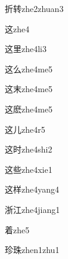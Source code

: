 \begin{verbete}[7;8]{折转}{zhe2zhuan3}
\end{verbete}

\begin{verbete}[7]{这}{zhe4}
\end{verbete}

\begin{verbete}[7;7]{这里}{zhe4li3}
\end{verbete}

\begin{verbete}[7;3]{这么}{zhe4me5}
\end{verbete}

\begin{verbete}[7;5]{这末}{zhe4me5}
\end{verbete}

\begin{verbete}[7;14]{这麽}{zhe4me5}
\end{verbete}

\begin{verbete}[7;2]{这儿}{zhe4r5}
\end{verbete}

\begin{verbete}[7;7]{这时}{zhe4shi2}
\end{verbete}

\begin{verbete}[7;8]{这些}{zhe4xie1}
\end{verbete}

\begin{verbete}[7;10]{这样}{zhe4yang4}
\end{verbete}

\begin{verbete*}[10;6]{浙江}{zhe4jiang1}
\end{verbete*}

\begin{verbete}[11]{着}{zhe5}
\end{verbete}

\begin{verbete}[9;10]{珍珠}{zhen1zhu1}
\end{verbete}

